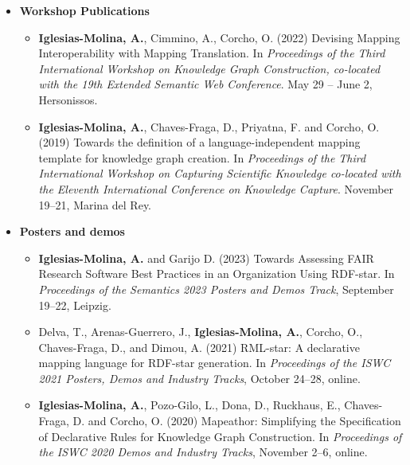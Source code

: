 \begin{itemize}
    \item \textbf{Workshop Publications}
    \begin{itemize}
        \item \textbf{Iglesias-Molina, A.}, Cimmino, A., Corcho, O. (2022) Devising Mapping Interoperability with Mapping Translation. In \textit{Proceedings of the Third International Workshop on Knowledge Graph Construction, co-located with the 19th Extended Semantic Web Conference}. May 29 -- June 2, Hersonissos. 
    
        
        \item \textbf{Iglesias-Molina, A.}, Chaves-Fraga, D., Priyatna, F. and Corcho, O. (2019) Towards the definition of a language-independent mapping template for knowledge graph creation. In \textit{Proceedings of the Third International Workshop on Capturing Scientific Knowledge co-located with the Eleventh International Conference on Knowledge Capture}. November 19--21, Marina del Rey.
    \end{itemize}
\end{itemize}

\begin{itemize}
    \item \textbf{Posters and demos}
    \begin{itemize}
        \item \textbf{Iglesias-Molina, A.} and Garijo D. (2023) Towards Assessing FAIR Research Software Best Practices in an Organization Using RDF-star. In \textit{Proceedings of the Semantics 2023 Posters and Demos Track}, September 19--22, Leipzig.
        
        \item Delva, T., Arenas-Guerrero, J., \textbf{Iglesias-Molina, A.}, Corcho, O., Chaves-Fraga, D., and Dimou, A. (2021) RML-star: A declarative mapping language for RDF-star generation. In \textit{Proceedings of the ISWC 2021 Posters, Demos and Industry Tracks}, October 24--28, online.
    
        \item \textbf{Iglesias-Molina, A.}, Pozo-Gilo, L., Dona, D., Ruckhaus, E., Chaves-Fraga, D. and Corcho, O. (2020) Mapeathor: Simplifying the Specification of Declarative Rules for Knowledge Graph Construction. In \textit{Proceedings of the ISWC 2020 Demos and Industry Tracks}, November 2--6, online.
    \end{itemize}
\end{itemize}



